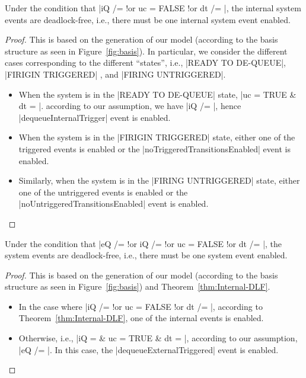 \begin{theorem}
  \label{thm:Internal-DLF}
  Under the condition that %
  |iQ /= {} !or uc = FALSE !or dt /= {}|, %
  the internal system events are deadlock-free, i.e., there must be
  one internal system event enabled.
\end{theorem}
\begin{proof}
  This is based on the generation of our \EventB model (according to
  the basis structure as seen in Figure~\ref{fig:basis}).  In
  particular, we consider the different cases corresponding to the
  different ``states'', i.e., |READY TO DE-QUEUE|, |FIRIGIN TRIGGERED|
  , and |FIRING UNTRIGGERED|.
  \begin{itemize}
  \item When the system is in the |READY TO DE-QUEUE| state, %
    |uc = TRUE & dt = {}|.  %
    according to our assumption, we have |iQ /= {}|, hence
    |dequeueInternalTrigger| event is enabled.
    
  \item When the system is in the |FIRIGIN TRIGGERED| state,
    either one of the triggered events is enabled or the
    |noTriggeredTransitionsEnabled| event is enabled.
    
  \item Similarly, when the system is in the |FIRING UNTRIGGERED|
      state, either one of the untriggered events is enabled or the
      |noUntriggeredTransitionsEnabled| event is enabled.  
  \end{itemize}
\end{proof}
    
\begin{corollary}
  Under the condition that %
  |eQ /= {} !or iQ /= {} !or uc = FALSE !or dt /= {}|, %
  the system events are deadlock-free, i.e., there must be
  one system event enabled.
\end{corollary}
\begin{proof}
  This is based on the generation of our \EventB model (according to
  the basis structure as seen in Figure~\ref{fig:basis}) and
  Theorem~\ref{thm:Internal-DLF}.
  \begin{itemize}
  \item In the case where |iQ /= {} !or uc = FALSE !or dt /= {}|,
    according to Theorem~\ref{thm:Internal-DLF}, one of the internal
    events is enabled.
    
  \item Otherwise, i.e., |iQ = {} & uc = TRUE & dt = {}|, according to
    our assumption, |eQ /= {}|. In this case, the
    |dequeueExternalTriggered| event is enabled.
\end{itemize}
\end{proof}


